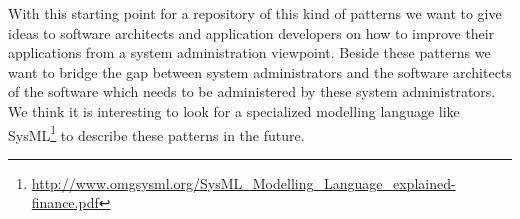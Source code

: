 With this starting point for a repository of this kind of patterns we want to give ideas to software architects and application developers on how to improve their applications from a system administration viewpoint. Beside these patterns we want to bridge the gap between system administrators and the software architects of the software which needs to be administered by these system administrators. \\
We think it is interesting to look for a specialized modelling language like SysML\footnote{\url{http://www.omgsysml.org/SysML_Modelling_Language_explained-finance.pdf}} to describe these patterns in the future. 